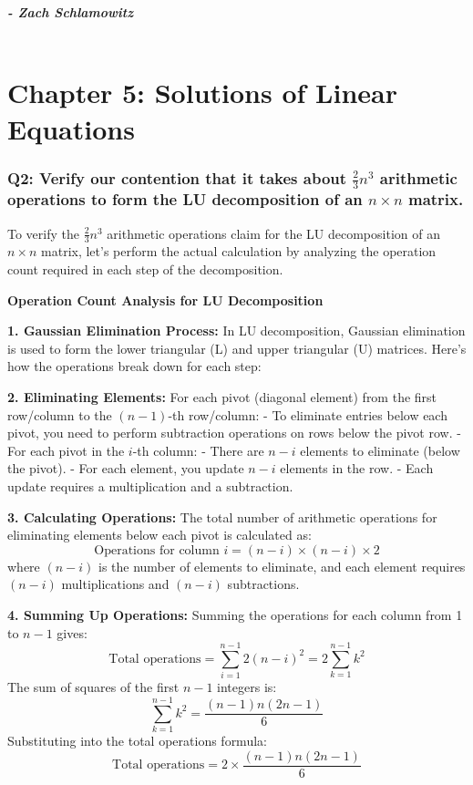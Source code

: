 \documentclass[8pt]{article}
\begin{document}
\textbf{\textit{- Zach Schlamowitz }} \\\\

\newpage

\section*{Chapter 5: Solutions of Linear Equations}

\subsubsection*{Q2: Verify our contention that it takes about \(\frac{2}{3} n^3\) arithmetic operations to form the LU decomposition of an \(n \times n\) matrix.}

To verify the \(\frac{2}{3} n^3\) arithmetic operations claim for the LU decomposition of an \(n \times n\) matrix, let's perform the actual calculation by analyzing the operation count required in each step of the decomposition.

\textbf{Operation Count Analysis for LU Decomposition}

\textbf{1. Gaussian Elimination Process:}
   In LU decomposition, Gaussian elimination is used to form the lower triangular (L) and upper triangular (U) matrices. Here's how the operations break down for each step:

\textbf{2. Eliminating Elements:}
   For each pivot (diagonal element) from the first row/column to the \((n-1)\)-th row/column:
   - To eliminate entries below each pivot, you need to perform subtraction operations on rows below the pivot row.
   - For each pivot in the \(i\)-th column:
     - There are \(n-i\) elements to eliminate (below the pivot).
     - For each element, you update \(n-i\) elements in the row.
     - Each update requires a multiplication and a subtraction.

\textbf{3. Calculating Operations:}
   The total number of arithmetic operations for eliminating elements below each pivot is calculated as:
   \[
   \text{Operations for column } i = (n-i) \times (n-i) \times 2
   \]
   where \( (n-i) \) is the number of elements to eliminate, and each element requires \( (n-i) \) multiplications and \( (n-i) \) subtractions.

\textbf{4. Summing Up Operations:}
   Summing the operations for each column from 1 to \(n-1\) gives:
   \[
   \text{Total operations} = \sum_{i=1}^{n-1} 2(n-i)^2 = 2\sum_{k=1}^{n-1} k^2
   \]
   The sum of squares of the first \(n-1\) integers is:
   \[
   \sum_{k=1}^{n-1} k^2 = \frac{(n-1)n(2n-1)}{6}
   \]
   Substituting into the total operations formula:
   \[
   \text{Total operations} = 2 \times \frac{(n-1)n(2n-1)}{6}
   \]
\end{document}

